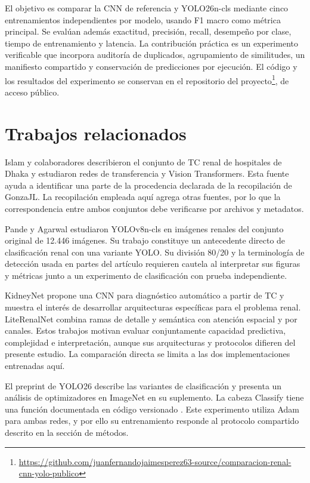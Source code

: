 \documentclass[conference]{IEEEtran}
\begin{document}
El objetivo es comparar la CNN de referencia y YOLO26n-cls mediante cinco entrenamientos independientes por modelo, usando F1 macro como métrica principal. Se evalúan además exactitud, precisión, recall, desempeño por clase, tiempo de entrenamiento y latencia. La contribución práctica es un experimento verificable que incorpora auditoría de duplicados, agrupamiento de similitudes, un manifiesto compartido y conservación de predicciones por ejecución.
El código y los resultados del experimento se conservan en el repositorio del proyecto\footnote{\url{https://github.com/juanfernandojaimesperez63-source/comparacion-renal-cnn-yolo-publico}}, de acceso público.
\section{Trabajos relacionados}
Islam y colaboradores \cite{islam} describieron el conjunto de TC renal de hospitales de Dhaka y estudiaron redes de transferencia y Vision Transformers. Esta fuente ayuda a identificar una parte de la procedencia declarada de la recopilación de GonzaJL. La recopilación empleada aquí agrega otras fuentes, por lo que la correspondencia entre ambos conjuntos debe verificarse por archivos y metadatos.

Pande y Agarwal \cite{pande} estudiaron YOLOv8n-cls en imágenes renales del conjunto original de 12.446 imágenes. Su trabajo constituye un antecedente directo de clasificación renal con una variante YOLO. Su división 80/20 y la terminología de detección usada en partes del artículo requieren cautela al interpretar sus figuras y métricas junto a un experimento de clasificación con prueba independiente.

KidneyNet \cite{kidneynet} propone una CNN para diagnóstico automático a partir de TC y muestra el interés de desarrollar arquitecturas específicas para el problema renal. LiteRenalNet \cite{lite} combina ramas de detalle y semántica con atención espacial y por canales. Estos trabajos motivan evaluar conjuntamente capacidad predictiva, complejidad e interpretación, aunque sus arquitecturas y protocolos difieren del presente estudio. La comparación directa se limita a las dos implementaciones entrenadas aquí.

El preprint de YOLO26 \cite{yolo26} describe las variantes de clasificación y presenta un análisis de optimizadores en ImageNet en su suplemento. La cabeza Classify tiene una función documentada en código versionado \cite{ultralytics}. Este experimento utiliza Adam para ambas redes, y por ello su entrenamiento responde al protocolo compartido descrito en la sección de métodos.
\end{document}
